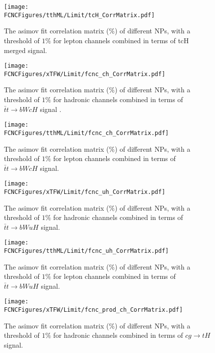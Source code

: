\begin{figure}[H]
\centering
\texttt{[image: \\FCNCFigures/tthML/Limit/tcH\_CorrMatrix.pdf]}
\caption{ The asimov fit correlation matrix ($\%$) of different NPs, with a threshold of $1\%$ for lepton channels combined in terms of tcH merged signal.}
\label{fig:tcH_CorrMatrix_2}
\end{figure}




\begin{figure}[H]
\centering
\texttt{[image: \\FCNCFigures/xTFW/Limit/fcnc\_ch\_CorrMatrix.pdf]}
\caption{ The asimov fit correlation matrix ($\%$) of different NPs, with a threshold of $1\%$ for hadronic channels combined in terms of $\bar{t}t\to bWcH$ signal . }
\label{fig:fcnc_ch_CorrMatrix_1}
\end{figure}

\begin{figure}[H]
\centering
\texttt{[image: \\FCNCFigures/tthML/Limit/fcnc\_ch\_CorrMatrix.pdf]}
\caption{ The asimov fit correlation matrix ($\%$) of different NPs, with a threshold of $1\%$ for  lepton channels combined in terms of $\bar{t}t\to bWcH$ signal. }
\label{fig:fcnc_ch_CorrMatrix_2}
\end{figure}






\begin{figure}[H]
\centering
\texttt{[image: \\FCNCFigures/xTFW/Limit/fcnc\_uh\_CorrMatrix.pdf]}
\caption{ The asimov fit correlation matrix ($\%$) of different NPs, with a threshold of $1\%$ for hadronic channels combined in terms of $\bar{t}t\to bWuH$ signal.}
\label{fig:fcnc_uh_CorrMatrix_1}
\end{figure}



\begin{figure}[H]
\centering
\texttt{[image: \\FCNCFigures/tthML/Limit/fcnc\_uh\_CorrMatrix.pdf]}
\caption{ The asimov fit correlation matrix ($\%$) of different NPs, with a threshold of $1\%$ for  lepton channels combined in terms of $\bar{t}t\to bWuH$ signal.}
\label{fig:fcnc_uh_CorrMatrix_2}
\end{figure}



\begin{figure}[H]
\centering
\texttt{[image: \\FCNCFigures/xTFW/Limit/fcnc\_prod\_ch\_CorrMatrix.pdf]}
\caption{ The asimov fit correlation matrix ($\%$) of different NPs, with a threshold of $1\%$ for hadronic channels combined in terms of $cg\to tH$ signal.}
\label{fig:fcnc_prod_ch_CorrMatrix_1}
\end{figure}



